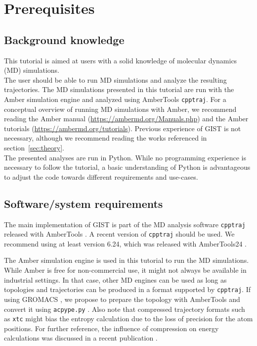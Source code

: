 \documentclass[9pt,tutorial]{livecoms}
\newcommand{\software}{\texttt}
\newcommand\inlinecode{\texttt}
\begin{document}
\section{Prerequisites}


\subsection{Background knowledge}
This tutorial is aimed at users with a solid knowledge of molecular dynamics (MD) simulations.\\
The user should be able to run MD simulations and analyze the resulting trajectories. 
The MD simulations presented in this tutorial are run with the Amber simulation engine and analyzed using AmberTools \software{cpptraj}. 
For a conceptual overview of running MD simulations with Amber, we recommend reading the Amber manual (\url{https://ambermd.org/Manuals.php}) \cite{amber24} and the Amber tutorials (\url{https://ambermd.org/tutorials}). 
Previous experience of GIST is not necessary, although we recommend reading the works referenced in section~\ref{sec:theory}.\\
The presented analyses are run in Python.
While no programming experience is necessary to follow the tutorial, a basic understanding of Python is advantageous to adjust the code towards different requirements and use-cases.

\subsection{Software/system requirements}
The main implementation of GIST is part of the MD analysis software \software{cpptraj} released with AmberTools \cite{amber24, Case2023-ambertools}.
A recent version of \software{cpptraj} should be used. We recommend using at least version 6.24, which was released with AmberTools24 \cite{Case2023-ambertools}.

The Amber simulation engine is used in this tutorial to run the MD simulations.
While Amber is free for non-commercial use, it might not always be available in industrial settings.
In that case, other MD engines can be used as long as topologies and trajectories can be produced in a format supported by \software{cpptraj}.
If using GROMACS \cite{Abraham2015-gromacs,Pronk2013-gromacs}, we propose to prepare the topology with AmberTools \cite{Case2023-ambertools} and convert it using \software{acpype.py} \cite{Sousa_da_Silva2012-acpype}.
Also note that compressed trajectory formats such as \inlinecode{xtc} might bias the entropy calculation due to the loss of precision for the atom positions. For further reference, the influence of compression on energy calculations was discussed in a recent publication \cite{Roe2022-compression}.
\end{document}
